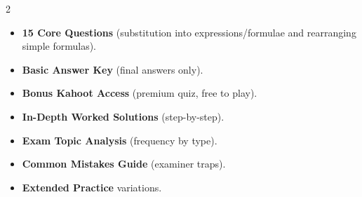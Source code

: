 \documentclass[11pt,a4paper]{article}
\newcommand{\FullReleaseDate}{April 30, 2026}
\begin{document}
\vspace{8pt}

\begin{multicols}{2}
  \begin{tcolorbox}[card, title=\sffamily\bfseries\textcolor{white}{\faHandPointDown\ TODAY (Simplified Version)}, colbacktitle=mainblue, boxed title style={sharp corners, boxrule=0pt}]
    \begin{itemize}[leftmargin=1.2em, itemsep=2pt]
      \item \small \textbf{15 Core Questions} (substitution into expressions/formulae and rearranging simple formulas).
      \item \small \textbf{Basic Answer Key} (final answers only).
      \item \small \textbf{Bonus Kahoot Access} (premium quiz, free to play).
    \end{itemize}
  \end{tcolorbox}

  \columnbreak

  \begin{tcolorbox}[card, title=\sffamily\bfseries\textcolor{white}{\faRocket\ ON \FullReleaseDate\ (Full Upgrade)}, colbacktitle=mainblue, boxed title style={sharp corners, boxrule=0pt}]
    \begin{itemize}[leftmargin=1.2em, itemsep=2pt]
      \item \small \textbf{In-Depth Worked Solutions} (step-by-step).
      \item \small \textbf{Exam Topic Analysis} (frequency by type).
      \item \small \textbf{Common Mistakes Guide} (examiner traps).
      \item \small \textbf{Extended Practice} variations.
    \end{itemize}
  \end{tcolorbox}
\end{multicols}
\end{document}
